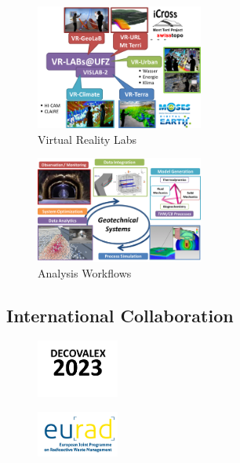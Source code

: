 \begin{figure}
\vspace{-5mm}
\centering
\includegraphics[width=0.49\textwidth]{figures/vr-labs}
\caption{Virtual Reality Labs}
\label{fig:workflows}
\end{figure}
\lipsum[2]

\begin{figure}
\vspace{-5mm}
\centering
\includegraphics[width=0.49\textwidth]{figures/workflow-geotechnics}
\caption{Analysis Workflows}
\label{fig:workflows}
\end{figure}
\lipsum[2]

\subsection*{International Collaboration}

\begin{figure}
\vspace{-5mm}
\centering
\includegraphics[width=0.24\textwidth]{figures/d2023}
\caption{}
\label{fig:workflows}
\end{figure}
\lipsum[2]

\begin{figure}
\vspace{-5mm}
\centering
\includegraphics[width=0.24\textwidth]{figures/eurad}
\caption{}
\label{fig:workflows}
\end{figure}
\lipsum[2]

